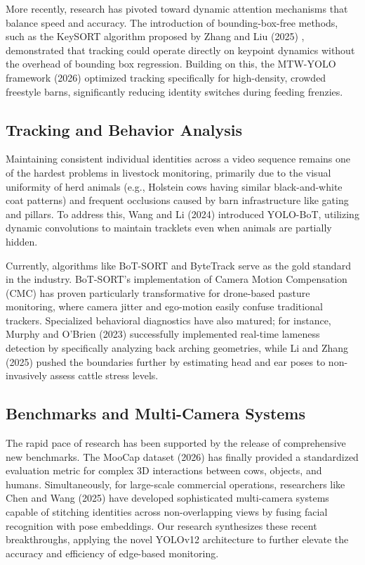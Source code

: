\documentclass[conference]{IEEEtran}
\begin{document}
More recently, research has pivoted toward dynamic attention mechanisms that balance speed and accuracy. The introduction of bounding-box-free methods, such as the KeySORT algorithm proposed by Zhang and Liu (2025) \cite{zhang2025keysort}, demonstrated that tracking could operate directly on keypoint dynamics without the overhead of bounding box regression. Building on this, the MTW-YOLO framework (2026) \cite{gao2026mtw} optimized tracking specifically for high-density, crowded freestyle barns, significantly reducing identity switches during feeding frenzies.

\subsection{Tracking and Behavior Analysis}
Maintaining consistent individual identities across a video sequence remains one of the hardest problems in livestock monitoring, primarily due to the visual uniformity of herd animals (e.g., Holstein cows having similar black-and-white coat patterns) and frequent occlusions caused by barn infrastructure like gating and pillars. To address this, Wang and Li (2024) \cite{wang2024yolobot} introduced YOLO-BoT, utilizing dynamic convolutions to maintain tracklets even when animals are partially hidden. 

Currently, algorithms like BoT-SORT \cite{aharon2022botsort} and ByteTrack \cite{zhang2022bytetrack} serve as the gold standard in the industry. BoT-SORT's implementation of Camera Motion Compensation (CMC) has proven particularly transformative for drone-based pasture monitoring, where camera jitter and ego-motion easily confuse traditional trackers. Specialized behavioral diagnostics have also matured; for instance, Murphy and O'Brien (2023) \cite{murphy2023lameness} successfully implemented real-time lameness detection by specifically analyzing back arching geometries, while Li and Zhang (2025) \cite{li2025headpose} pushed the boundaries further by estimating head and ear poses to non-invasively assess cattle stress levels.

\subsection{Benchmarks and Multi-Camera Systems}
The rapid pace of research has been supported by the release of comprehensive new benchmarks. The MooCap dataset (2026) \cite{sun2026moocap} has finally provided a standardized evaluation metric for complex 3D interactions between cows, objects, and humans. Simultaneously, for large-scale commercial operations, researchers like Chen and Wang (2025) \cite{chen2025multicamera} have developed sophisticated multi-camera systems capable of stitching identities across non-overlapping views by fusing facial recognition with pose embeddings. Our research synthesizes these recent breakthroughs, applying the novel YOLOv12 architecture to further elevate the accuracy and efficiency of edge-based monitoring.
\end{document}
